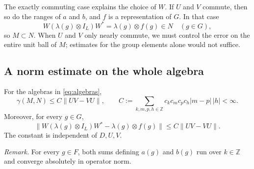 The exactly commuting case explains the choice of $W$. If $U$ and $V$
commute, then so do the ranges of $a$ and $b$, and $f$ is a
representation of $G$. In that case
\[
 W(\lambda(g)\otimes I_L)W^*=\lambda(g)\otimes f(g)\in N
 \quad(g\in G),
\]
so $M\subset N$. When $U$ and $V$ only nearly commute, we must
control the error on the entire unit ball of $M$; estimates for the
group elements alone would not suffice.

\subsection{A norm estimate on the whole algebra}
\begin{proposition}\label{prop:near}
For the algebras in \eqref{eq:algebras},
\begin{equation}\label{eq:near-bound}
 \gamma(M,N)\leq C\|UV-VU\|,
 \qquad
 C:=\sum_{k,m,p,h\in\mathbb Z}
       c_kc_mc_pc_h|m-p|\,|h|<\infty.
\end{equation}
Moreover, for every $g\in G$,
\begin{equation}\label{eq:group-bound}
 \bigl\|W(\lambda(g)\otimes I_L)W^*
            -\lambda(g)\otimes f(g)\bigr\|
 \leq C\|UV-VU\|.
\end{equation}
The constant is independent of $D,U,V$.
\end{proposition}

\noindent\textit{Remark.} For every $g\in F$, both sums defining $a(g)$ and $b(g)$ run over $k\in\mathbb Z$ and converge absolutely in operator norm.


